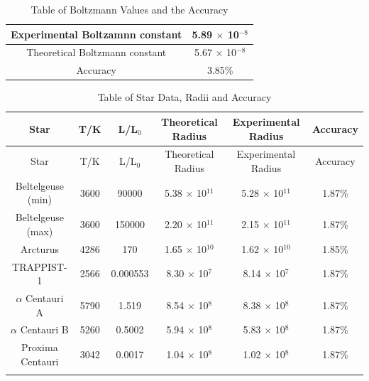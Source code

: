 \documentclass[12pt, a4paper]{article}
\begin{document}
\begin{table}[H]
    \centering
    \begin{tabular}{|c|c|}
        \hline 
        Experimental Boltzamnn constant & 5.89 \(\times\) 10\(^{-8}\) \\ \hline
        Theoretical Boltzmann constant & 5.67 \(\times\) 10\(^{-8}\) \\ \hline
        Accuracy & 3.85\% \\ \hline
    \end{tabular}
    \caption{Table of Boltzmann Values and the Accuracy}
    \label{Tab: Table 2.2}
\end{table}

\begin{longtable}{|c|c|c|c|c|c|}
    \hline Star & T/K & L/L\(_0\) & Theoretical Radius & Experimental Radius & Accuracy\\ \hline
    \endfirsthead

    \hline Star & T/K & L/L\(_0\) & Theoretical Radius & Experimental Radius & Accuracy\\ \hline
    \endhead

    Beltelgeuse (min) & 3600 & 90000 & 5.38 \(\times\) 10\(^{11}\) & 5.28 \(\times\) 10\(^{11}\) & 1.87\%\\ \hline
    Beltelgeuse (max) & 3600 & 150000 & 2.20 \(\times\) 10\(^{11}\) & 2.15 \(\times\) 10\(^{11}\) & 1.87\%\\ \hline
    Arcturus & 4286 & 170 & 1.65 \(\times\) 10\(^{10}\) & 1.62 \(\times\) 10\(^{10}\) & 1.85\%\\ \hline
    TRAPPIST-1  & 2566 & 0.000553 & 8.30 \(\times\) 10\(^{7}\) & 8.14 \(\times\) 10\(^{7}\) & 1.87\%\\ \hline
    \(\alpha\) Centauri A  & 5790 & 1.519 & 8.54 \(\times\) 10\(^{8}\) & 8.38 \(\times\) 10\(^{8}\) & 1.87\%\\ \hline
    \(\alpha\) Centauri B  & 5260 & 0.5002 & 5.94 \(\times\) 10\(^{8}\) & 5.83 \(\times\) 10\(^{8}\) & 1.87\%\\ \hline
    Proxima Centauri & 3042 & 0.0017 & 1.04 \(\times\) 10\(^{8}\) & 1.02 \(\times\) 10\(^{8}\) & 1.87\%\\ \hline

    \caption{Table of Star Data, Radii and Accuracy}
    \label{Tab: Table 2.3}\\
\end{longtable}
\end{document}
